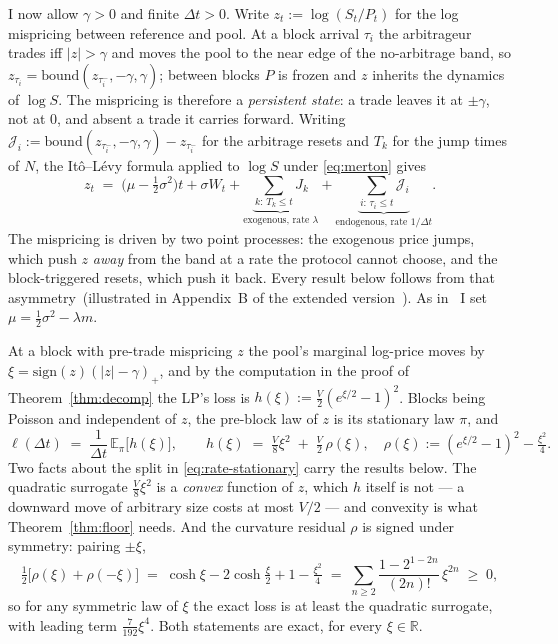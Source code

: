 \documentclass[runningheads]{llncs}
\newcommand{\E}{\mathbb{E}}
\newcommand{\R}{\mathbb{R}}
\newcommand{\dt}{\Delta t}
\newcommand{\1}{\mathbf{1}}
\newcommand{\bound}{\mathrm{bound}}
\newif\ifextended
\begin{document}
I now allow $\gamma > 0$ and finite $\dt > 0$. Write $z_t := \log(S_t/P_t)$ for the log mispricing between reference and pool. At a block arrival $\tau_i$ the arbitrageur trades iff $|z|>\gamma$ and moves the pool to the near edge of the no-arbitrage band, so $z_{\tau_i} = \bound(z_{\tau_i^-},-\gamma,\gamma)$; between blocks $P$ is frozen and $z$ inherits the dynamics of $\log S$. The mispricing is therefore a \emph{persistent state}: a trade leaves it at $\pm\gamma$, not at $0$, and absent a trade it carries forward. Writing $\mathcal{J}_i := \bound(z_{\tau_i^-},-\gamma,\gamma)-z_{\tau_i^-}$ for the arbitrage resets and $T_k$ for the jump times of $N$, the It\^o--L\'evy formula applied to $\log S$ under \eqref{eq:merton} gives
\begin{equation}\label{eq:ourz}
z_t \;=\; \big(\mu-\tfrac12\sigma^2\big)t + \sigma W_t + \underbrace{\sum_{k:\,T_k\le t} J_k}_{\text{exogenous, rate }\lambda} + \underbrace{\sum_{i:\,\tau_i\le t}\mathcal{J}_i}_{\text{endogenous, rate }1/\dt}.
\end{equation}
The mispricing is driven by two point processes: the exogenous price jumps, which push $z$ \emph{away} from the band at a rate the protocol cannot choose, and the block-triggered resets, which push it back. Every result below follows from that asymmetry\ifextended\ (Figure~\ref{fig:zpath}, Appendix~\ref{app:figs}, illustrates)\else\ (illustrated in Appendix~B of the extended version~\cite{bundi2026ext})\fi. As in~\cite[Assumption~2]{milionis2023automated} I set $\mu = \tfrac{1}{2}\sigma^2 - \lambda m$.

At a block with pre-trade mispricing $z$ the pool's marginal log-price moves by $\xi = \mathrm{sign}(z)(|z|-\gamma)_+$, and by the computation in the proof of Theorem~\ref{thm:decomp} the LP's loss is $h(\xi) := \tfrac{V}{2}(e^{\xi/2}-1)^2$. Blocks being Poisson and independent of $z$, the pre-block law of $z$ is its stationary law $\pi$, and
\begin{equation}\label{eq:rate-stationary}
\ell(\dt) \;=\; \frac{1}{\dt}\,\E_{\pi}\big[h(\xi)\big], \qquad h(\xi) \;=\; \tfrac{V}{8}\xi^2 \;+\; \tfrac{V}{2}\,\rho(\xi), \quad \rho(\xi) := (e^{\xi/2}-1)^2 - \tfrac{\xi^2}{4}.
\end{equation}
Two facts about the split in \eqref{eq:rate-stationary} carry the results below. The quadratic surrogate $\tfrac{V}{8}\xi^2$ is a \emph{convex} function of $z$, which $h$ itself is not --- a downward move of arbitrary size costs at most $V/2$ --- and convexity is what Theorem~\ref{thm:floor} needs. And the curvature residual $\rho$ is signed under symmetry: pairing $\pm\xi$,
\begin{equation}\label{eq:rhosign}
\tfrac12\big[\rho(\xi)+\rho(-\xi)\big] \;=\; \cosh\xi - 2\cosh\tfrac{\xi}{2} + 1 - \tfrac{\xi^2}{4} \;=\; \sum_{n\ge2}\frac{1-2^{1-2n}}{(2n)!}\,\xi^{2n} \;\ge\; 0,
\end{equation}
so for any symmetric law of $\xi$ the exact loss is at least the quadratic surrogate, with leading term $\tfrac{7}{192}\xi^4$. Both statements are exact, for every $\xi\in\R$.
\end{document}
